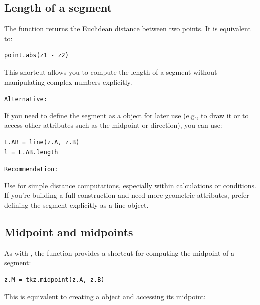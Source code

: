 \subsection{Length of a segment}
\label{sub:length_of_a_segment}

The function  returns the Euclidean distance between two points. It is equivalent to:

\begin{mybox}
\begin{verbatim}
point.abs(z1 - z2)
\end{verbatim}
\end{mybox}

This shortcut allows you to compute the length of a segment without manipulating complex numbers explicitly.

\medskip
\texttt{Alternative: }

If you need to define the segment as a  object for later use (e.g., to draw it or to access other attributes such as the midpoint or direction), you can use:

\begin{mybox}
\begin{verbatim}
L.AB = line(z.A, z.B)
l = L.AB.length
\end{verbatim}
\end{mybox}

\medskip
\texttt{Recommendation: }

Use  for simple distance computations, especially within calculations or conditions. If you're building a full construction and need more geometric attributes, prefer defining the segment explicitly as a line object.

\subsection{Midpoint and midpoints}
\label{sub:midpoint_and_midpoints}

As with , the function  provides a shortcut for computing the midpoint of a segment:

\begin{mybox}
\begin{verbatim}
z.M = tkz.midpoint(z.A, z.B)
\end{verbatim}
\end{mybox}

This is equivalent to creating a  object and accessing its midpoint:

